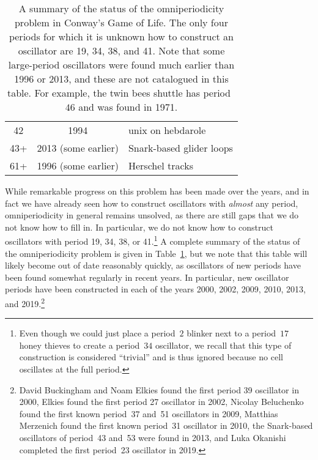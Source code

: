 \begin{table}[!htb]
\begin{center}
\begin{tabular}{c c l}
			42 & 1994 & unix on hebdarole \\
			\rowcolor{gray!20} 43+ & 2013 (some earlier) & Snark-based glider loops \\
			61+ & 1996 (some earlier) & Herschel tracks \\\bottomrule
		\end{tabular}
		\caption{A summary of the status of the omniperiodicity problem in Conway's Game of Life. The only four periods for which it is unknown how to construct an oscillator are 19, 34, 38, and 41. Note that some large-period oscillators were found much earlier than 1996 or 2013, and these are not catalogued in this table. For example, the twin bees shuttle has period~$46$ and was found in 1971.}\label{tab:omniperiodic}
	\end{center}
\end{table}

While remarkable progress on this problem has been made over the years, and in fact we have already seen how to construct oscillators with \emph{almost} any period, omniperiodicity in general remains unsolved, as there are still gaps that we do not know how to fill in. In particular, we do not know how to construct oscillators with period 19, 34, 38, or 41.\footnote{Even though we could just place a period~$2$ blinker next to a period~$17$ honey thieves to create a period~$34$ oscillator, we recall that this type of construction is considered ``trivial'' and is thus ignored because no cell oscillates at the full period.} A complete summary of the status of the omniperiodicity problem is given in Table~\ref{tab:omniperiodic}, but we note that this table will likely become out of date reasonably quickly, as oscillators of new periods have been found somewhat regularly in recent years. In particular, new oscillator periods have been constructed in each of the years 2000, 2002, 2009, 2010, 2013, and 2019.\footnote{David Buckingham and Noam Elkies found the first period 39 oscillator in 2000, Elkies found the first period 27 oscillator in 2002, Nicolay Beluchenko found the first known period~37 and~51 oscillators in 2009, Matthias Merzenich found the first known period~31 oscillator in 2010, the Snark-based oscillators of period~43 and~53 were found in 2013, and Luka Okanishi completed the first period~23 oscillator in 2019.}

